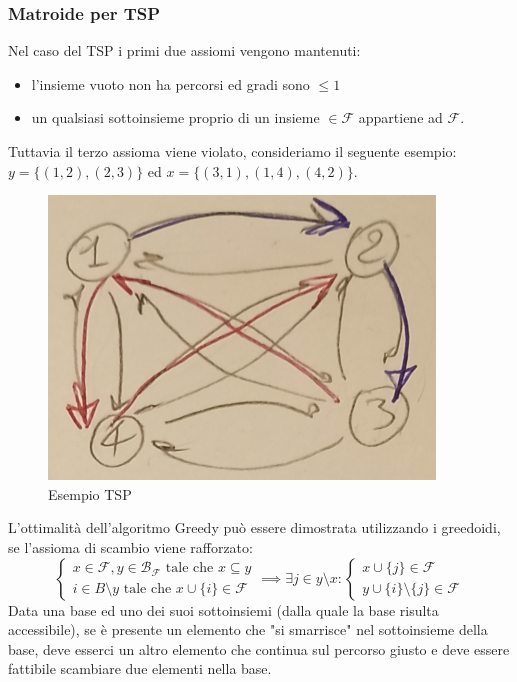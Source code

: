 \documentclass{article}
\begin{document}
\subsubsection{Matroide per TSP}
Nel caso del TSP i primi due assiomi vengono mantenuti:
\begin{itemize}
    \item l'insieme vuoto non ha percorsi ed gradi sono $\leq 1$
    \item un qualsiasi sottoinsieme proprio di un insieme $\in\mathcal{F}$ appartiene ad $\mathcal{F}$.
\end{itemize}
Tuttavia il terzo assioma viene violato, consideriamo il seguente esempio: $y=\{(1,2),(2,3)\}$ ed $x=\{(3,1),(1,4),(4,2)\}$.
\begin{figure}
    \centering
    \includegraphics[scale=0.5]{images/matroid_tsp.png}
    \caption{Esempio TSP}
\end{figure}

L'ottimalità dell'algoritmo Greedy può essere dimostrata utilizzando i greedoidi,
se l'assioma di scambio viene rafforzato:
\[
    \begin{cases}
        x\in\mathcal{F},y\in\mathcal{B}_\mathcal{F}\text{ tale che } x\subseteq y \\
        i\in B\setminus y\text{ tale che } x\cup\{i\}\in\mathcal{F}
    \end{cases}
    \implies
    \exists j\in y\setminus x :
    \begin{cases}
        x\cup\{j\}\in\mathcal{F} \\
        y\cup\{i\}\setminus\{j\}\in\mathcal{F}
    \end{cases}
\]
Data una base ed uno dei suoi sottoinsiemi (dalla quale la base risulta
accessibile), se è presente un elemento che "si smarrisce" nel sottoinsieme della base,
deve esserci un altro elemento che continua sul percorso giusto e deve essere
fattibile scambiare due elementi nella base.
\end{document}
